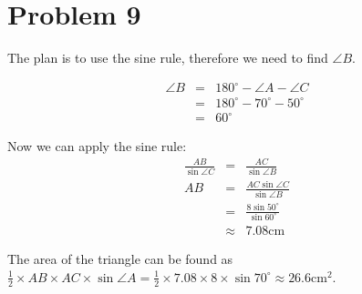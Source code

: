 \section*{Problem 9}
The plan is to use the sine rule, therefore we need to find $ \angle B $.

\begin{eqnarray*}
  \angle B &=& 180^\circ - \angle A - \angle C \\
           &=& 180^\circ - 70^\circ - 50^\circ \\
            &=& 60^\circ
\end{eqnarray*}

Now we can apply the sine rule:
\begin{eqnarray*}
    \frac{AB}{\sin \angle C} &=      & \frac{AC}{\sin \angle B} \\
                          AB &=      & \frac{AC \sin \angle C}{\sin \angle B} \\
                             &=      & \frac{8 \sin 50^\circ}{\sin 60^\circ} \\
                             &\approx& 7.08 \text{cm}
\end{eqnarray*}

The area of the triangle can be found as $ \frac{1}{2} \times AB \times AC \times \sin \angle A = \frac{1}{2} \times 7.08 \times 8 \times \sin 70^\circ \approx 26.6 \text{cm}^2 $.

